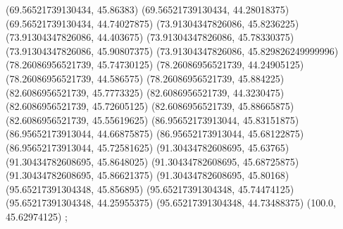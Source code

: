 {{{		(69.56521739130434, 45.86383)
		(69.56521739130434, 44.28018375)
		(69.56521739130434, 44.74027875)
		(73.91304347826086, 45.8236225)
		(73.91304347826086, 44.403675)
		(73.91304347826086, 45.78330375)
		(73.91304347826086, 45.90807375)
		(73.91304347826086, 45.829826249999996)
		(78.26086956521739, 45.74730125)
		(78.26086956521739, 44.24905125)
		(78.26086956521739, 44.586575)
		(78.26086956521739, 45.884225)
		(82.6086956521739, 45.7773325)
		(82.6086956521739, 44.3230475)
		(82.6086956521739, 45.72605125)
		(82.6086956521739, 45.88665875)
		(82.6086956521739, 45.55619625)
		(86.95652173913044, 45.83151875)
		(86.95652173913044, 44.66875875)
		(86.95652173913044, 45.68122875)
		(86.95652173913044, 45.72581625)
		(91.30434782608695, 45.63765)
		(91.30434782608695, 45.8648025)
		(91.30434782608695, 45.68725875)
		(91.30434782608695, 45.86621375)
		(91.30434782608695, 45.80168)
		(95.65217391304348, 45.856895)
		(95.65217391304348, 45.74474125)
		(95.65217391304348, 44.25955375)
		(95.65217391304348, 44.73488375)
		(100.0, 45.62974125)
	};

}}

